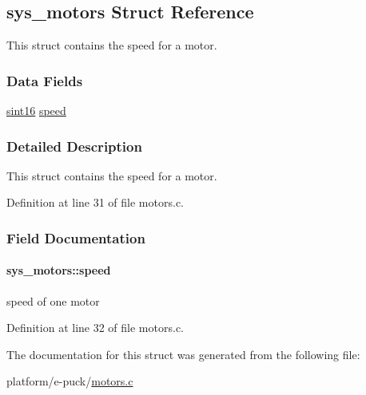 \hypertarget{structsys__motors}{}\subsection{sys\+\_\+motors Struct Reference}
\label{structsys__motors}


This struct contains the speed for a motor.  


\subsubsection*{Data Fields}
\begin{DoxyCompactItemize}
\item 
\hyperlink{definitions_8h_a74df79fde3c518e55b29ce6360a9c76e}{sint16} \hyperlink{structsys__motors_af89d21697771aa8b6aa25781f01e7174}{speed}
\end{DoxyCompactItemize}


\subsubsection{Detailed Description}
This struct contains the speed for a motor. 

Definition at line 31 of file motors.\+c.



\subsubsection{Field Documentation}
\hypertarget{structsys__motors_af89d21697771aa8b6aa25781f01e7174}{}
\paragraph[{speed}]{ sys\+\_\+motors\+::speed}\label{structsys__motors_af89d21697771aa8b6aa25781f01e7174}
speed of one motor 

Definition at line 32 of file motors.\+c.



The documentation for this struct was generated from the following file\+:\begin{DoxyCompactItemize}
\item 
platform/e-\/puck/\hyperlink{motors_8c}{motors.\+c}\end{DoxyCompactItemize}
